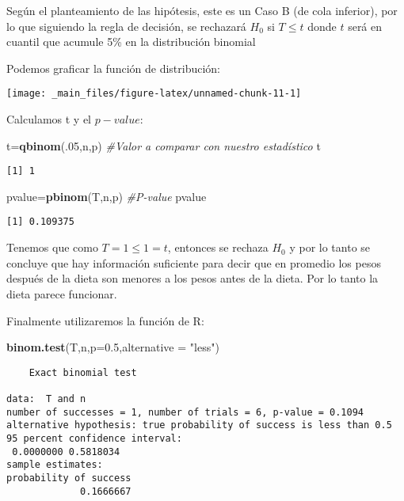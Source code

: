 \documentclass[
  a4paper,
  oneside,
  openany]{book}
\newenvironment{Shaded}{\begin{snugshade}}{\end{snugshade}}
\newcommand{\CommentTok}[1]{\textcolor[rgb]{0.56,0.35,0.01}{\textit{#1}}}
\newcommand{\DataTypeTok}[1]{\textcolor[rgb]{0.13,0.29,0.53}{#1}}
\newcommand{\DecValTok}[1]{\textcolor[rgb]{0.00,0.00,0.81}{#1}}
\newcommand{\FloatTok}[1]{\textcolor[rgb]{0.00,0.00,0.81}{#1}}
\newcommand{\KeywordTok}[1]{\textcolor[rgb]{0.13,0.29,0.53}{\textbf{#1}}}
\newcommand{\NormalTok}[1]{#1}
\newcommand{\StringTok}[1]{\textcolor[rgb]{0.31,0.60,0.02}{#1}}
\begin{document}
Según el planteamiento de las hipótesis, este es un Caso B (de cola inferior), por lo que siguiendo la regla de decisión, se rechazará \(H_0\) si \(T\leq t\) donde \(t\) será en cuantil que acumule 5\% en la distribución binomial

Podemos graficar la función de distribución:

\begin{center}\texttt{[image: \_main\_files/figure-latex/unnamed-chunk-11-1]} \end{center}

Calculamos t y el \(p-value\):

\begin{Shaded}
\begin{Highlighting}[]
\NormalTok{t=}\KeywordTok{qbinom}\NormalTok{(.}\DecValTok{05}\NormalTok{,n,p)         }\CommentTok{\#Valor a comparar con nuestro estadístico}
\NormalTok{t}
\end{Highlighting}
\end{Shaded}

\begin{verbatim}
[1] 1
\end{verbatim}

\begin{Shaded}
\begin{Highlighting}[]
\NormalTok{pvalue=}\KeywordTok{pbinom}\NormalTok{(T,n,p)       }\CommentTok{\#P{-}value}
\NormalTok{pvalue}
\end{Highlighting}
\end{Shaded}

\begin{verbatim}
[1] 0.109375
\end{verbatim}

Tenemos que como \(T=1\leq 1 =t\), entonces se rechaza \(H_0\) y por lo tanto se concluye que hay información suficiente para decir que en promedio los pesos después de la dieta son menores a los pesos antes de la dieta. Por lo tanto la dieta parece funcionar.

Finalmente utilizaremos la función de R:

\begin{Shaded}
\begin{Highlighting}[]
\KeywordTok{binom.test}\NormalTok{(T,n,}\DataTypeTok{p=}\FloatTok{0.5}\NormalTok{,}\DataTypeTok{alternative =} \StringTok{"less"}\NormalTok{)}
\end{Highlighting}
\end{Shaded}

\begin{verbatim}
    Exact binomial test

data:  T and n
number of successes = 1, number of trials = 6, p-value = 0.1094
alternative hypothesis: true probability of success is less than 0.5
95 percent confidence interval:
 0.0000000 0.5818034
sample estimates:
probability of success 
             0.1666667 
\end{verbatim}
\end{document}
